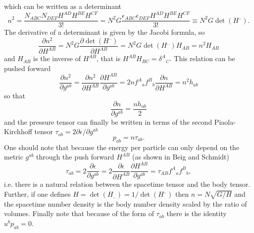 which can be written as a determinant
\begin{equation}
\label{eqn:numberDensity}
n^2 =  \frac{N_{ABC}N_{DEF}H^{AD}H^{BE}H^{CF}}{3!} = N^2G\frac{\epsilon_{ABC}\epsilon_{DEF}H^{AD}H^{BE}H^{CF}}{3!} \equiv N^2G \det(H^{..}).
\end{equation}
The derivative of a determinant is given by the Jacobi formula, so
\begin{equation}
\frac{\partial n^2}{\partial H^{AB}} = N^2G\frac{\partial \det(H^{..})}{\partial H^{AB}} = N^2 G \det(H^{..}) H_{AB} = n^2 H_{AB}
\end{equation}
and $H_{AB}$ is the inverse of $H^{AB}$, that is $H^{AB}H_{BC} = \delta^A{}_C$. This relation can be pushed forward
\begin{equation}
\frac{\partial n^2}{\partial g^{ab}} = \frac{\partial n^2}{\partial H^{AB}} \frac{\partial H^{AB}}{\partial g^{ab}} = 2nf^A{}_af^{B}{}_b\frac{\partial n}{\partial H^{AB}} = n^2 h_{ab}
\end{equation}
so that
\begin{equation}
\frac{\partial n}{\partial g^{ab}} = \frac{nh_{ab}}{2}
\end{equation}
and the pressure tensor can finally be written in terms of the second Piaola-Kirchhoff tensor $\tau_{ab} = 2\partial\epsilon / \partial g^{ab}$
\begin{equation}
p_{ab} = n\tau_{ab}.
\end{equation}
One should note that because the energy per particle can only depend on the metric $g^{ab}$ through the push forward $H^{AB}$ (as shown in Beig and Schmidt)
\begin{equation}
\tau_{ab} = 2 \frac{\partial \epsilon}{\partial g^{ab}} = 2\frac{\partial \epsilon}{\partial H^{AB}}\frac{\partial H^{AB}}{\partial g^{ab}} = \tau_{AB}f^A{}_af^{B}{}_b,
\end{equation}
i.e. there is a natural relation between the spacetime tensor and the body tensor. Further, if one defines $H = \det(H_{..}) = 1/\det(H^{..})$ then $n=N\sqrt{G/H}$ and the spacetime number density is the body number density scaled by the ratio of volumes. Finally note that because of the form of $\tau_{ab}$ there is the identity $u^bp_{ab} = 0$.